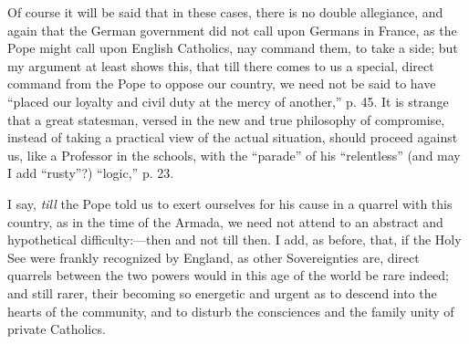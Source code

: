 Of course it will be said that in these cases, there is no double
allegiance, and again that the German government did not call upon
Germans in France, as the Pope might call upon English Catholics, nay
command them, to take a side; but my argument at least shows this, that
till there comes to us a special, direct command from the Pope to oppose
our country, we need not be said to have ``placed our loyalty and
civil duty at the mercy of another,'' p. 45. It is strange that a
great statesman, versed in the new and true philosophy of compromise,
instead of taking a practical view of the actual situation, should
proceed against us, like a Professor in the schools, with the
``parade'' of his ``relentless'' (and may I add
``rusty''?) ``logic,'' p. 23.

I say, \emph{till} the Pope told us to exert ourselves for his cause
in a quarrel with this country, as in the time of the Armada, we need
not attend to an abstract and hypothetical difficulty:—then and not
till then. I add, as before, that, if the Holy See were frankly
recognized by England, as other Sovereignties are, direct quarrels
between the two powers would in this age of the world be rare indeed;
and still rarer, their becoming so energetic and urgent as to descend
into the hearts of the community, and to disturb the consciences and the
family unity of private Catholics.

